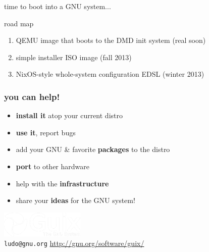 \documentclass{beamer}
\begin{document}
\begin{frame}{time to boot into a GNU system...}
\begin{tikzpicture}[overlay]
  \end{tikzpicture}
\end{frame}

\begin{frame}{road map}
  \begin{enumerate}
    \item<1-> QEMU image that boots to the DMD init system (real soon)
    \item<2-> simple installer ISO image (fall 2013)
    \item<3-> NixOS-style whole-system configuration EDSL (winter 2013)
  \end{enumerate}


\end{frame}

\begin{frame}
  \frametitle{you can help!}

  \begin{itemize}
    \item \textbf{install it} atop your current distro
    \item \textbf{use it}, report bugs
    \item add your GNU \& favorite \textbf{packages} to the distro
    \item \textbf{port} to other hardware
    \item help with the \textbf{infrastructure}
    \item share your \textbf{ideas} for the GNU system!
  \end{itemize}
\end{frame}

\begin{frame}{}

\vfill{
  \vspace{6.5cm}
  \hfill{\includegraphics[width=0.3\textwidth]{images/guix-logo-white}}\\[0.2cm]
  \texttt{ludo@gnu.org} \hfill{\alert{\url{http://gnu.org/software/guix/}}}
}

\end{frame}
\end{document}
